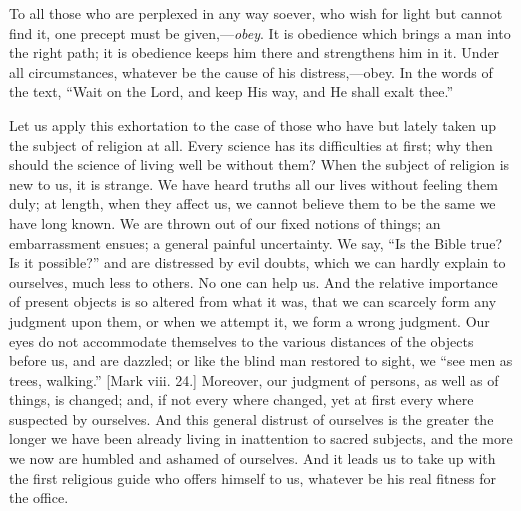 To all those who are perplexed in any way soever, who
wish for light but cannot find it, one precept must be
given,—\emph{obey}. It is obedience which brings a
man into the right path; it is obedience keeps him there
and strengthens him in it. Under all circumstances,
whatever be the cause of his distress,—obey. In the
words of the text, ``Wait on the Lord, and keep His
way, and He shall exalt thee.''

Let us apply this exhortation to the case of those who
have but lately taken up the subject of religion at all.
Every science has its difficulties at first; why then
should the science of living well be without them? When
the subject of religion is new to us, it is strange. We
have heard truths all our lives without feeling them
duly; at length, when they affect us, we cannot believe
them to be the same we have long known. We are thrown out
of our fixed notions of things; an embarrassment ensues;
a general painful uncertainty. We say, ``Is the Bible
true? Is it possible?'' and are distressed by evil
doubts, which we can hardly explain to ourselves, much
less to others. No one can help us. And the relative
importance of present objects is so altered from what it
was, that we can scarcely form any judgment upon them, or
when we attempt it, we form a wrong judgment. Our eyes do
not accommodate themselves to the various distances of
the objects before us, and are dazzled; or like the blind
man restored to sight, we ``see men as trees,
walking.'' [Mark viii. 24.] Moreover, our judgment of
persons, as well as of things, is changed; and, if not
every where changed, yet at first every where suspected
by ourselves. And this general distrust of ourselves is
the greater the longer we have been already living in
inattention to sacred subjects, and the more we now are
humbled and ashamed of ourselves. And it leads us to take
up with the first religious guide who offers himself to
us, whatever be his real fitness for the office.

